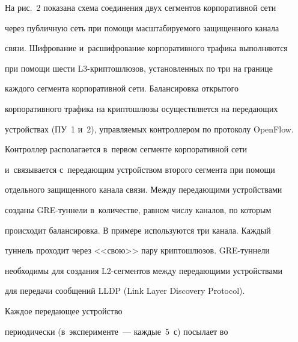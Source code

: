   


  На рис.~2 показана схема соединения двух сегментов корпоративной сети 


через публичную сеть при помощи масштабируемого защищенного канала 


связи. Шифрование и~расшифрование корпоративного трафика выполняются 


при помощи шести L3-крип\-то\-шлю\-зов, установленных по три на границе 


каждого сегмента корпоративной сети. Балансировка открытого 


корпоративного трафика на крип\-то\-шлю\-зы осуществляется на передающих 


устройствах (ПУ~1 и~2), управляемых контроллером по протоколу OpenFlow. 


Контроллер располагается в~первом сегменте корпоративной сети 


и~связывается с~передающим устройством второго сегмента при помощи 


отдельного защищенного канала связи. Между пе\-ре\-да\-ющи\-ми устройствами 


созданы GRE-туннели в~количестве, равном числу каналов, по которым 


происходит балансировка. В примере используются три канала. Каждый 


туннель проходит через <<свою>> пару криптошлюзов. GRE-тун\-не\-ли 


необходимы для создания L2-сег\-мен\-тов между передающими устройствами 


для передачи сообщений LLDP (Link Layer Discovery Protocol). 


Каждое передающее устройство 


периодически (в~эксперименте~--- каждые~5~с) посылает во\linebreak\vspace*{-12pt}





\pagebreak





\





\vspace*{-12pt}





